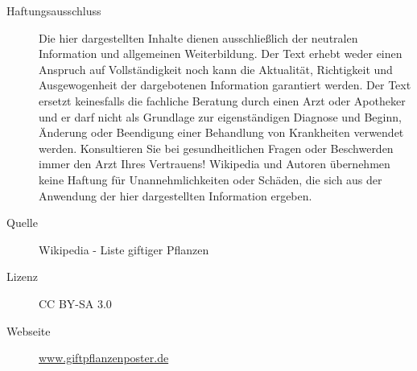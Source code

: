 \documentclass[a1,portrait]{a0poster}
\begin{document}
\begin{multicols*}{6}
\begin{description}
\item[Haftungsausschluss] Die hier dargestellten Inhalte dienen ausschließlich der neutralen Information und allgemeinen Weiterbildung. Der Text erhebt weder einen Anspruch auf Vollständigkeit noch kann die Aktualität, Richtigkeit und Ausgewogenheit der dargebotenen Information garantiert werden. Der Text ersetzt keinesfalls die fachliche Beratung durch einen Arzt oder Apotheker und er darf nicht als Grundlage zur eigenständigen Diagnose und Beginn, Änderung oder Beendigung einer Behandlung von Krankheiten verwendet werden. Konsultieren Sie bei gesundheitlichen Fragen oder Beschwerden immer den Arzt Ihres Vertrauens! Wikipedia und Autoren übernehmen keine Haftung für Unannehmlichkeiten oder Schäden, die sich aus der Anwendung der hier dargestellten Information ergeben.

\item[Quelle] Wikipedia - Liste giftiger Pflanzen

\item[Lizenz] CC BY-SA 3.0

\item[Webseite] \url{www.giftpflanzenposter.de}
\end{description}

\end{multicols*}
\end{document}
